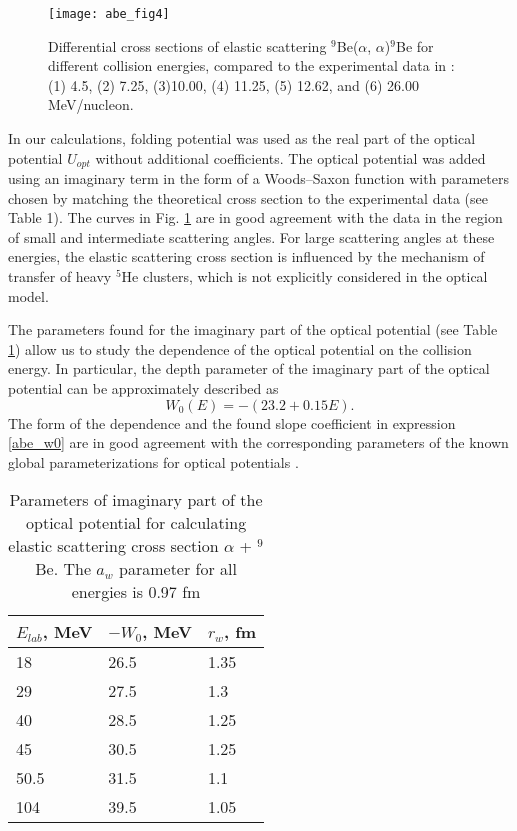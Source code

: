 \documentclass[
12pt, %
oneside, %
english, %
onehalfspacing, %
onehalfspacing, %
headsepline, %
]{MastersDoctoralThesis} %
\begin{document}
\begin{figure}[tp]
\centering
\texttt{[image: abe\_fig4]}
\decoRule
\caption{  \footnotesize   Differential cross sections of elastic scattering ${}^9$Be($\alpha$, $\alpha$)${}^9$Be for different collision energies, compared to the experimental data in \cite{lucas1964scattering,burtebaev2002,hauser1969elastic} : (1) 4.5, (2) 7.25, (3)10.00, (4) 11.25, (5) 12.62, and (6) 26.00 MeV/nucleon.
}
\label{abe_fig4}
\end{figure}


In our calculations, folding potential   was used as the real part of the optical potential  $U_{opt}$ without additional coefficients.
 The optical potential was added using an imaginary term in the form of a Woods–Saxon function with parameters chosen by matching the theoretical cross section to the experimental data (see Table 1).
  The curves in Fig. \ref{abe_fig4} are in good agreement with the data in the region of small and intermediate scattering angles. 
  For large scattering angles at these energies, the elastic scattering cross section is influenced by the mechanism of transfer of heavy $^5$He clusters, which is not explicitly considered in the optical model.

The parameters found for the imaginary part of the optical potential (see Table \ref{abe_tab1}) allow us to study the dependence of the optical potential on the collision energy. In particular, the depth parameter of the imaginary part of the optical potential can be approximately described as
\begin{equation}
W_0(E)=-(23.2+0.15E).
\label{abe_w0}
\end{equation}
The form of the dependence and the found slope coefficient in expression \ref{abe_w0} are in good agreement with the corresponding parameters of the known global parameterizations for optical potentials \cite{avrigeanu1994global}.


\begin{table}[bp]
\caption{
\footnotesize
Parameters of imaginary part of the optical potential for calculating elastic scattering cross section $\alpha$ + $^9$Be. The $a_w$ parameter for all energies is 0.97 fm
}
\label{abe_tab1}
\centering
\footnotesize
\begin{tabular}{lll}
\hline
$E_{lab}$, MeV & $-W_0$, MeV & $r_w$, fm \\ \hline
18             & 26.5        & 1.35      \\
29             & 27.5        & 1.3       \\
40             & 28.5        & 1.25      \\
45             & 30.5        & 1.25      \\
50.5           & 31.5        & 1.1       \\
104            & 39.5        & 1.05      \\ \hline
\end{tabular}
\end{table}
\end{document}
